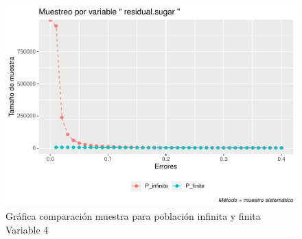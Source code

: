 \documentclass[
]{article}
\begin{document}
\begin{figure}
\centering
\includegraphics{1_examen_solucion_files/figure-latex/grafica sys4-1.pdf}
\caption{Gráfica comparación muestra para población infinita y finita
Variable 4}
\end{figure}
\end{document}
